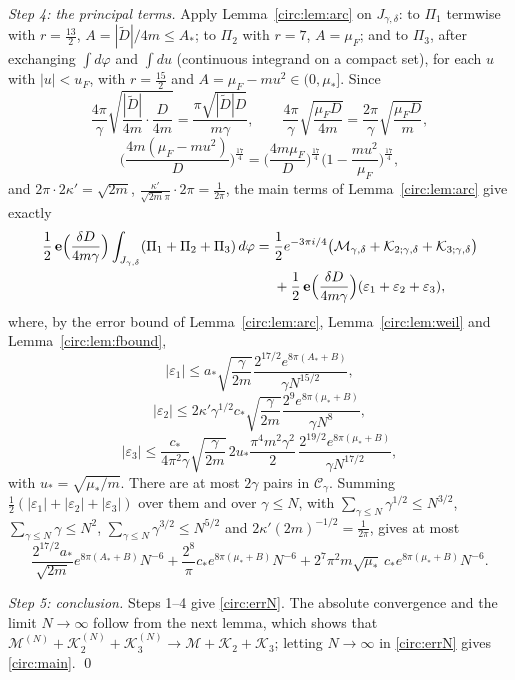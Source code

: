 \emph{Step 4: the principal terms.} Apply Lemma~\ref{circ:lem:arc} on $J_{\gamma,\delta}$: to $\Pi_1$ termwise with $r=\frac{13}2$, $A=|\tilde D|/4m\le A_*$; to $\Pi_2$ with $r=7$, $A=\mu_F$; and to $\Pi_3$, after exchanging $\int d\varphi$ and $\int du$ (continuous integrand on a compact set), for each $u$ with $|u|<u_F$, with $r=\frac{15}2$ and $A=\mu_F-mu^2\in(0,\mu_*]$. Since
\[
\frac{4\pi}\gamma\sqrt{\frac{|\tilde D|}{4m}\cdot\frac D{4m}}=\frac{\pi\sqrt{|\tilde D|D}}{m\gamma},\qquad\frac{4\pi}\gamma\sqrt{\frac{\mu_F D}{4m}}=\frac{2\pi}\gamma\sqrt{\frac{\mu_FD}m},
\]
\[
\Big(\frac{4m(\mu_F-mu^2)}D\Big)^{\frac{17}4}=\Big(\frac{4m\mu_F}D\Big)^{\frac{17}4}\Big(1-\frac{mu^2}{\mu_F}\Big)^{\frac{17}4},
\]
and $2\pi\cdot2\kappa'=\sqrt{2m}$, $\frac{\kappa'}{\sqrt{2m}\pi}\cdot2\pi=\frac1{2\pi}$, the main terms of Lemma~\ref{circ:lem:arc} give exactly
\[
\begin{aligned}
\frac12\,\mathbf e\Big(\frac{\delta D}{4m\gamma}\Big)\int_{J_{\gamma,\delta}}(\Pi_1+\Pi_2+\Pi_3)\,d\varphi={}&\frac12e^{-3\pi i/4}\big(\mathcal M_{\gamma,\delta}+\mathcal K_{2;\gamma,\delta}+\mathcal K_{3;\gamma,\delta}\big)\\
&+\frac12\,\mathbf e\Big(\frac{\delta D}{4m\gamma}\Big)(\varepsilon_1+\varepsilon_2+\varepsilon_3),
\end{aligned}
\]
where, by the error bound of Lemma~\ref{circ:lem:arc}, Lemma~\ref{circ:lem:weil} and Lemma~\ref{circ:lem:fbound},
\[
|\varepsilon_1|\le a_*\sqrt{\frac\gamma{2m}}\frac{2^{17/2}e^{8\pi(A_*+B)}}{\gamma N^{15/2}},
\]
\[
|\varepsilon_2|\le2\kappa'\gamma^{1/2}c_*\sqrt{\frac\gamma{2m}}\frac{2^9e^{8\pi(\mu_*+B)}}{\gamma N^8},
\]
\[
|\varepsilon_3|\le\frac{c_*}{4\pi^2\gamma}\sqrt{\frac\gamma{2m}}\,2u_*\frac{\pi^4m^2\gamma^2}2\,\frac{2^{19/2}e^{8\pi(\mu_*+B)}}{\gamma N^{17/2}},
\]
with $u_*=\sqrt{\mu_*/m}$. There are at most $2\gamma$ pairs in $\mathcal C_\gamma$. Summing $\frac12(|\varepsilon_1|+|\varepsilon_2|+|\varepsilon_3|)$ over them and over $\gamma\le N$, with $\sum_{\gamma\le N}\gamma^{1/2}\le N^{3/2}$, $\sum_{\gamma\le N}\gamma\le N^2$, $\sum_{\gamma\le N}\gamma^{3/2}\le N^{5/2}$ and $2\kappa'(2m)^{-1/2}=\frac1{2\pi}$, gives at most
\[
\frac{2^{17/2}a_*}{\sqrt{2m}}e^{8\pi(A_*+B)}N^{-6}+\frac{2^8}\pi c_*e^{8\pi(\mu_*+B)}N^{-6}+2^7\pi^2m\sqrt{\mu_*}\,c_*e^{8\pi(\mu_*+B)}N^{-6}.
\]

\emph{Step 5: conclusion.} Steps 1--4 give \eqref{circ:errN}. The absolute convergence and the limit $N\to\infty$ follow from the next lemma, which shows that $\mathcal M^{(N)}+\mathcal K_2^{(N)}+\mathcal K_3^{(N)}\to\mathcal M+\mathcal K_2+\mathcal K_3$; letting $N\to\infty$ in \eqref{circ:errN} gives \eqref{circ:main}. \qed

